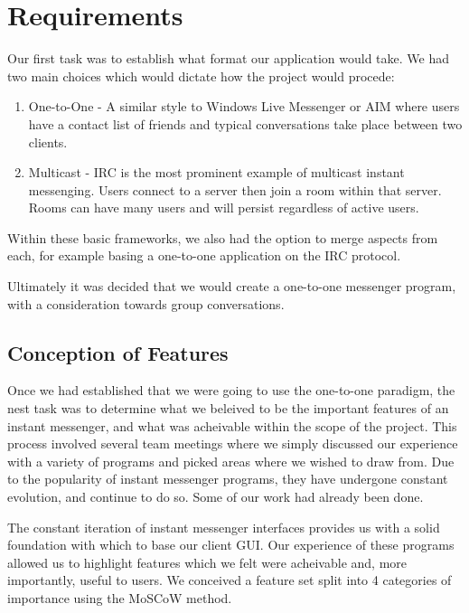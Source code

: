 \section{Requirements}

Our first task was to establish what format our application would take. We had two main choices which would dictate how the project would procede:

\begin{enumerate}
\item{One-to-One} - A similar style to Windows Live Messenger or AIM where users have a contact list of friends and typical conversations take place between two clients. 
\item{Multicast}  - IRC is the most prominent example of multicast instant messenging. Users connect to a server then join a room within that server. Rooms can have many users and will persist regardless of active users.
\end{enumerate}

Within these basic frameworks, we also had the option to merge aspects from each, for example basing a one-to-one application on the IRC protocol.

Ultimately it was decided that we would create a one-to-one messenger program, with a consideration towards group conversations. 

\subsection{Conception of Features}

Once we had established that we were going to use the one-to-one paradigm, the nest task was to determine what we beleived to be the important features of an instant messenger, and what was acheivable within the scope of the project. This process involved several team meetings where we simply discussed our experience with a variety of programs and picked areas where we wished to draw from. Due to the popularity of instant messenger programs, they have undergone constant evolution, and continue to do so. Some of our work had already been done.

The constant iteration of instant messenger interfaces provides us with a solid foundation with which to base our client GUI. Our experience of these programs allowed us to highlight features which we felt were acheivable and, more importantly, useful to users. We conceived a feature set split into 4 categories of importance using the MoSCoW method.

